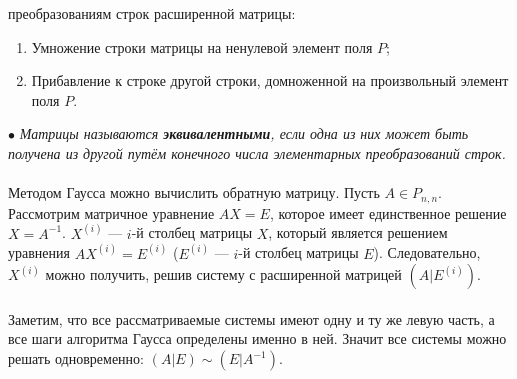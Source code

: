 преобразованиям строк расширенной матрицы:\begin{enumerate}
	\item Умножение строки матрицы на ненулевой элемент поля $P$;
	\item Прибавление к строке другой строки, домноженной на произвольный элемент поля $P$.
\end{enumerate}
$\bullet$ \textit{Матрицы называются \textbf{эквивалентными}, если одна из них может быть получена из
	другой путём конечного числа элементарных преобразований строк.}\\\\
Методом Гаусса можно вычислить обратную матрицу. Пусть $A \in P_{n,n}$. Рассмотрим матричное
уравнение $AX = E$, которое имеет единственное решение $X = A^{-1}$. $X^{(i)}$ --- $i$-й столбец матрицы $X$,
который является решением уравнения $AX^{(i)} = E^{(i)}$ ($E^{(i)}$ --- $i$-й столбец матрицы $E$). Следовательно, $X^{(i)}$ можно получить, решив систему с расширенной матрицей $(A|E^{(i)})$.\\\\
Заметим, что все рассматриваемые системы имеют одну и ту же левую часть, а все шаги алгоритма
Гаусса определены именно в ней. Значит все системы можно решать одновременно: $(A|E) \sim (E|A^{-1})$.